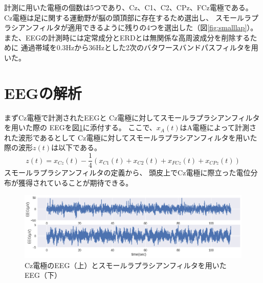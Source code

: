 計測に用いた電極の個数は5つであり、Cz、C1、C2、CPz、FCz電極である。
Cz電極は足に関する運動野が脳の頭頂部に存在するため選出し、
スモールラプラシアンフィルタが適用できるように残りの4つを選出した（図\ref{fig:smalllap}）。
また、EEGの計測時には定常成分とERDとは無関係な高周波成分を削除するために
通過帯域を0.3Hzから36Hzとした2次のバタワースバンドパスフィルタを用いた。

\section{EEGの解析}
まずCz電極で計測されたEEGと
Cz電極に対してスモールラプラシアンフィルタを用いた際の
EEGを図\ref{fig:eegsub1}に添付する。
ここで、\(x_{A}(t)\)はA電極によって計測された波形であるとして
Cz電極に対してスモールラプラシアンフィルタを用いた際の波形\(z(t)\)は以下である。
\begin{equation}
    z(t) = x_{Cz}(t) - \frac{1}{4}(x_{C1}(t) + x_{C2}(t) + x_{FCz}(t) + x_{CPz}(t))
\end{equation}
スモールラプラシアンフィルタの定義から、
頭皮上でCz電極に際立った電位分布が獲得されていることが期待できる。

\begin{figure}
    \centering
    \includegraphics[width=13cm]{images/eeg_sub1.png}
    \caption{Cz電極のEEG（上）とスモールラプラシアンフィルタを用いたEEG（下）}
    \label{fig:eegsub1}
\end{figure}



